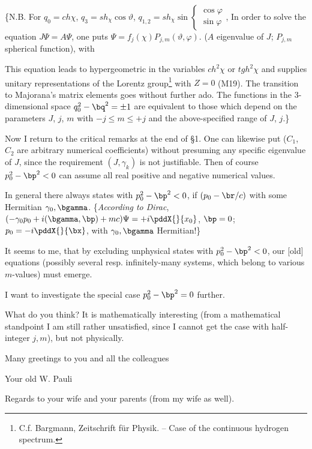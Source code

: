 \{N.B. For $q_0 = ch\chi$, $q_3 = sh_\chi \cos\vartheta$, $q_{1,2} = sh_\chi \sin\begin{cases}\cos\varphi\\ \sin\varphi\end{cases}$,
In order to solve the equation $J\Psi = A\Psi$, one puts $\Psi=f_j(\chi)P_{j,m}(\vartheta,\varphi)$. ($A$ eigenvalue of $J$; $P_{j,m}$ spherical function), with

This equation leads to hypergeometric \?{} in the variables $ch^2\chi$ or $tgh^2\chi$ and supplies unitary representations of the Lorentz group\footnote{C.f. Bargmann, Zeitschrift für Physik. -- Case of the continuous hydrogen spectrum.} with $Z=0$ (M19). The transition to Majorana's matrix elements goes without further ado. The functions in the 3-dimensional space $q_0^2 - \bq^2 = \pm 1$ are equivalent to those which depend on the parameters $J$, $j$, $m$ with $-j \le m \le +j$ and the above-specified range of $J$, $j$.\}

Now I return to the critical remarks at the end of §1. One can likewise put
($C_1$, $C_2$ are arbitrary numerical coefficients) without presuming any specific eigenvalue of $J$, since the requirement $(J,\gamma_k)$ is not justifiable. Then of course $p_0^2-\bp^2<0$ can assume all real positive and negative numerical values.

In general there always states with $p_0^2 - \bp^2 < 0$, if $(p_0 - \br/c)$
with some Hermitian $\gamma_0, \bgamma$. \{\textit{According to Dirac}, $(-\gamma_0 p_0 + i(\bgamma, \bp) + mc)\Psi = +i\pddX{}{x_0}$, $\bp = 0$; $p_0 = -i\pddX{}{\bx}$, with $\gamma_0, \bgamma$ Hermitian!\}

It seems to me, that by excluding unphysical states with $p_0^2 - \bp^2 < 0$, our [old] equations (possibly several resp. infinitely-many systems, which belong to various $m$-values) must emerge.

I want to investigate the special case $p_0^2 - \bp^2 = 0$ further.

What do you think? It is mathematically interesting (from a mathematical standpoint I am still rather unsatisfied, since I cannot get the case with half-integer $j,m$), but not physically.

Many greetings to you and all the colleagues

Your old W. Pauli

Regards to your wife and your parents (from my wife as well).
